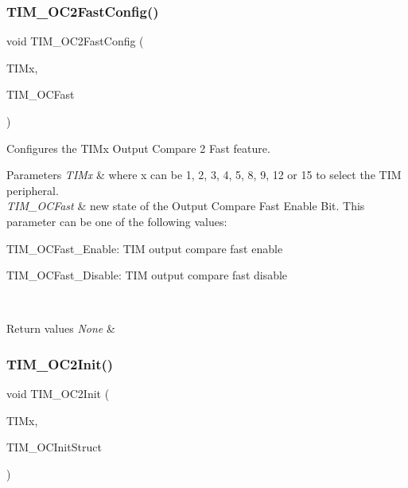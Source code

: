 \subsubsection{\texorpdfstring{TIM\_OC2FastConfig()}{TIM\_OC2FastConfig()}}
{\footnotesize\ttfamily void T\+I\+M\+\_\+\+O\+C2\+Fast\+Config (\begin{DoxyParamCaption}\item[{\mbox{\hyperlink{struct_t_i_m___type_def}{T\+I\+M\+\_\+\+Type\+Def}} $\ast$}]{T\+I\+Mx,  }\item[{uint16\+\_\+t}]{T\+I\+M\+\_\+\+O\+C\+Fast }\end{DoxyParamCaption})}



Configures the T\+I\+Mx Output Compare 2 Fast feature. 


\begin{DoxyParams}{Parameters}
{\em T\+I\+Mx} & where x can be 1, 2, 3, 4, 5, 8, 9, 12 or 15 to select the T\+IM peripheral. \\
\hline
{\em T\+I\+M\+\_\+\+O\+C\+Fast} & new state of the Output Compare Fast Enable Bit. This parameter can be one of the following values\+: \begin{DoxyItemize}
\item T\+I\+M\+\_\+\+O\+C\+Fast\+\_\+\+Enable\+: T\+IM output compare fast enable \item T\+I\+M\+\_\+\+O\+C\+Fast\+\_\+\+Disable\+: T\+IM output compare fast disable \end{DoxyItemize}
\\
\hline
\end{DoxyParams}

\begin{DoxyRetVals}{Return values}
{\em None} & \\
\hline
\end{DoxyRetVals}
\mbox{\label{group___t_i_m___private___functions_ga2017455121d910d6ff63ac6f219842c5}} 
\subsubsection{\texorpdfstring{TIM\_OC2Init()}{TIM\_OC2Init()}}
{\footnotesize\ttfamily void T\+I\+M\+\_\+\+O\+C2\+Init (\begin{DoxyParamCaption}\item[{\mbox{\hyperlink{struct_t_i_m___type_def}{T\+I\+M\+\_\+\+Type\+Def}} $\ast$}]{T\+I\+Mx,  }\item[{\mbox{\hyperlink{struct_t_i_m___o_c_init_type_def}{T\+I\+M\+\_\+\+O\+C\+Init\+Type\+Def}} $\ast$}]{T\+I\+M\+\_\+\+O\+C\+Init\+Struct }\end{DoxyParamCaption})}



